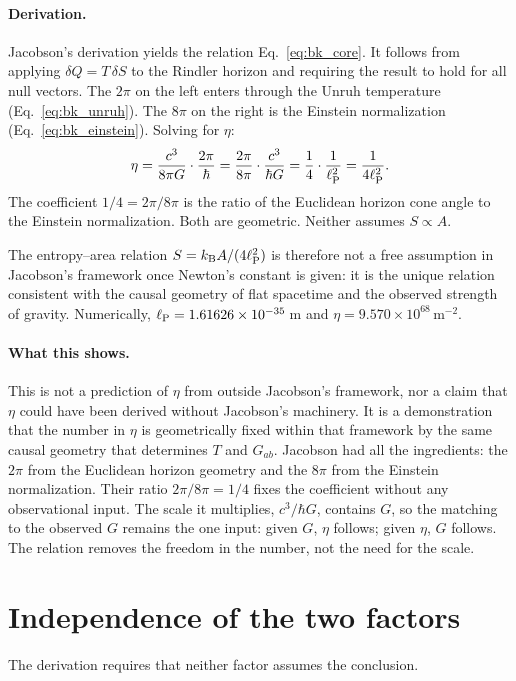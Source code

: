 \paragraph{Derivation.} Jacobson's derivation yields the relation Eq.~\eqref{eq:bk_core}. It follows from applying $\delta Q=T\,\delta S$ to the Rindler horizon and
requiring the result to hold for all null vectors. The $2\pi$ on the left enters through the Unruh temperature (Eq.~\eqref{eq:bk_unruh}). The $8\pi$ on the right is the
Einstein normalization (Eq.~\eqref{eq:bk_einstein}). Solving for $\eta$:
\begin{equation}
\eta=\frac{c^3}{8\pi G}\cdot\frac{2\pi}{\hbar}=\frac{2\pi}{8\pi}\cdot\frac{c^3}{\hbar G}=\frac14\cdot\frac{1}{\ell_{\mathrm P}^2}=\frac{1}{4\ell_{\mathrm P}^2}.\label{eq:bk_etasolve}
\end{equation}
The coefficient $1/4=2\pi/8\pi$ is the ratio of the Euclidean horizon cone angle to the Einstein normalization. Both are geometric. Neither assumes
$S\propto A$. \derived

The entropy--area relation $S=k_{\mathrm B} A/(4\ell_{\mathrm P}^2)$ is therefore not a free assumption in Jacobson's framework once Newton's constant is given: it is the unique
relation consistent with the causal geometry of flat spacetime and the observed strength of gravity. Numerically, $\ell_{\mathrm P}=1.61626\times10^{-35}$\,m and
$\eta=9.570\times10^{68}$\,m$^{-2}$. \calc

\paragraph{What this shows.} This is not a prediction of $\eta$ from outside Jacobson's framework, nor a claim that $\eta$ could have been derived without
Jacobson's machinery. It is a demonstration that the number in $\eta$ is geometrically fixed within that framework by the same causal geometry that
determines $T$ and $G_{ab}$. Jacobson had all the ingredients: the $2\pi$ from the Euclidean horizon geometry and the $8\pi$ from the Einstein
normalization. Their ratio $2\pi/8\pi=1/4$ fixes the coefficient without any observational input. The scale it multiplies, $c^3/\hbar G$, contains $G$,
so the matching to the observed $G$ remains the one input: given $G$, $\eta$ follows; given $\eta$, $G$ follows. The relation removes the freedom in the
number, not the need for the scale. \interp

\section{Independence of the two factors}\label{sec:bk_independence}
The derivation requires that neither factor assumes the conclusion.

